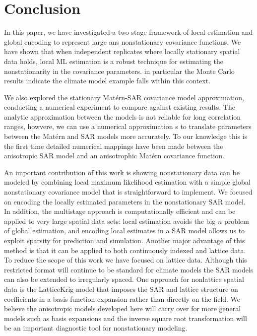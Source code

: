 \documentclass[review]{elsarticle}
\begin{document}
\section{Conclusion}

In this paper, we have investigated a two stage framework of local estimation and global encoding to represent large ans nonstationary covariance functions. We have shown that when independent replicates where  locally stationary spatial data holds,  local ML estimation is a robust technique for estimating the nonstationarity in the covariance parameters. in particular the Monte Carlo results indicate the climate model example falls within this context. 

We also explored the stationary Mat\'ern-SAR covariance model approximation, conducting a numerical experiment to compare against existing results. The analytic approximation between the models is not reliable for long correlation ranges, howvere, we can use a  numerical  approximation s to translate parameters between the Mat\'ern and SAR models more accurately. To our knowledge this is the first time detailed numerical mappings have been made between the anisotropic SAR model and an anisotrophic Mat\'ern covariance function. 

An important contribution of this work is showing nonstationary data can be modeled by combining local maximum likelihood estimation with a simple global nonstationary covariance model that is straightforward to implement. We focused on encoding the locally estimated parameters in the nonstationary SAR model. In addition, the multistage approach is computationally efficient and can be applied to very large spatial data sets: local estimation avoids the big $n$ problem of global estimation, and encoding local estimates in a SAR model allows us to exploit sparsity for prediction and simulation. Another major advantage of this method is that it can be applied to both continuously indexed and lattice data. 
To reduce the scope of this work we have focused on lattice data. Although this restricted format will continue to be standard for climate models the SAR models can also be extended to irregularly spaced. One approach for nonlattice spatial data is the LatticeKrig model that imposes the SAR and lattice structure on coefficients in a basis function expansion rather than directly on the field.  We believe the anisotropic models developed here will carry over for more general models such as basis expansions and the inverse square root transformation will be an important diagnostic tool for nonstationary modeling. 
 







\end{document}
